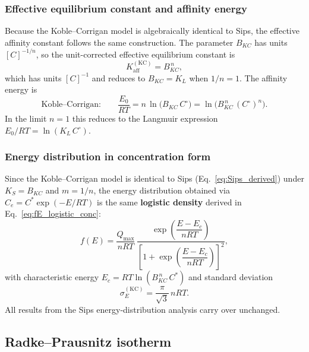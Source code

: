 \documentclass[12pt]{article}
\begin{document}
	\subsubsection{Effective equilibrium constant and affinity energy}

	Because the Koble--Corrigan model is algebraically identical to
	Sips, the effective affinity constant follows the same
	construction.  The parameter $B_{KC}$ has units $[C]^{-1/n}$, so
	the unit-corrected effective equilibrium constant is
	\begin{equation}
		K_{\mathrm{aff}}^{\mathrm{(KC)}} = B_{KC}^{\,n},
	\end{equation}
	which has units $[C]^{-1}$ and reduces to $B_{KC} = K_L$ when
	$1/n = 1$.  The affinity energy is
	\begin{equation}
		\text{Koble--Corrigan:}\qquad
		\frac{E_0}{RT}
		= n\,\ln\!\bigl(B_{KC}\,C^\circ\bigr)
		= \ln\!\bigl(B_{KC}^{\,n}\,(C^\circ)^{n}\bigr).
		\label{eq:E_KC}
	\end{equation}
	In the limit $n = 1$ this reduces to the Langmuir expression
	$E_0 / RT = \ln(K_L\,C^\circ)$.

	\subsubsection{Energy distribution in concentration form}

	Since the Koble--Corrigan model is identical to Sips
	(Eq.~\eqref{eq:Sips_derived}) under $K_S = B_{KC}$ and
	$m = 1/n$, the energy distribution obtained via
	$C_e = C^{\ast}\exp(-E/RT)$ is the same \textbf{logistic density}
	derived in Eq.~\eqref{eq:fE_logistic_conc}:
	\begin{equation}
		f(E)
		= \frac{Q_{\max}}{nRT}\,
		\frac{\exp\!\left(\dfrac{E - E_c}{nRT}\right)}
		{\left[1 + \exp\!\left(\dfrac{E - E_c}{nRT}\right)
		\right]^{2}},
		\label{eq:fE_KC}
	\end{equation}
	with characteristic energy $E_c = RT\ln(B_{KC}^{\,n}\,C^{\ast})$
	and standard deviation
	\begin{equation}
		\sigma_E^{\mathrm{(KC)}}
		= \frac{\pi}{\sqrt{3}}\,nRT.
		\label{eq:sigmaE_KC}
	\end{equation}
	All results from the Sips energy-distribution analysis carry over
	unchanged.

	\subsection{Radke--Prausnitz isotherm}
\end{document}
